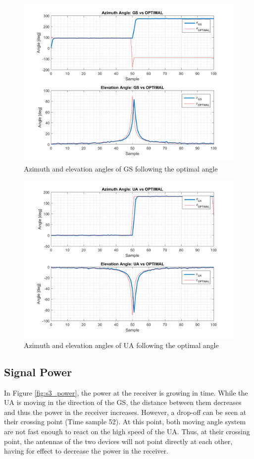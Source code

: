 \begin{figure}[H]
	\centering
	\includegraphics[scale=0.8]{figures/s3_gs.png}
	\caption{Azimuth and elevation angles of GS following the optimal angle}
	\label{fig:s3_gs}
\end{figure}

\begin{figure}[H]
	\centering
	\includegraphics[scale=0.8]{figures/s3_ua.png}
	\caption{Azimuth and elevation angles of UA following the optimal angle}
	\label{fig:s3_ua}
\end{figure}

\subsection*{Signal Power}
In Figure \ref{fig:s3_power}, the power at the receiver is growing in time. While the UA is moving in the direction of the GS, the distance between them decreases and thus the power in the receiver increases. However, a drop-off can be seen at their crossing point (Time sample 52). At this point, both moving angle system are not fast enough to react on the high speed of the UA. Thus, at their crossing point, the antennas of the two devices will not point directly at each other, having for effect to decrease the power in the receiver.

